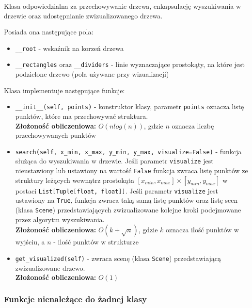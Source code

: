 \documentclass{article}
\begin{document}
Klasa odpowiedzialna za przechowywanie drzewa, enkapsulację wyszukiwania w drzewie oraz udostępnianie zwizualizowanego drzewa. 

Posiada ona następujące pola:
\begin{itemize}
    \item \texttt{\_\_root} - wskaźnik na korzeń drzewa
    \item \texttt{\_\_rectangles} oraz \texttt{\_\_dividers} - linie wyznaczające prostokąty, na które jest podzielone drzewo (pola używane przy wizualizacji)
\end{itemize}

Klasa implementuje następujące funkcje:
\begin{itemize}
    \item \texttt{\_\_init\_\_(self, points)} - konstruktor klasy, parametr \texttt{points} oznacza listę punktów, które ma przechowywać struktura.\\
    \textbf{Złożoność obliczeniowa:} $O(nlog(n))$, gdzie $n$ oznacza liczbę przechowywanych punktów

    \item \texttt{search(self, x\_min, x\_max, y\_min, y\_max, visualize=False)} - funkcja służąca do wyszukiwania w drzewie. Jeśli parametr \texttt{visualize} jest nieustawiony lub ustawiony na wartość \texttt{False} funkcja zwraca listę punktów ze struktury leżących wewnątrz prostokąta $[x_{min}, x_{max}] \times [y_{min}, y_{max}]$ w postaci \texttt{List[Tuple[float, float]]}. Jeśli parametr \texttt{visualize} jest ustawiony na \texttt{True}, funkcja zwraca taką samą listę punktów oraz listę scen (klasa \texttt{Scene}) przedstawiających zwizualizowane kolejne kroki podejmowane przez algorytm wyszukiwania. \\
    \textbf{Złożoność obliczeniowa: } $O(k + \sqrt{n})$, gdzie $k$ oznacza ilość punktów w wyjściu, a $n$ - ilość punktów w strukturze
    
    \item \texttt{get\_visualized(self)} - zwraca scenę (klasa \texttt{Scene}) przedstawiającą zwizualizowane drzewo.\\
    \textbf{Złożoność obliczeniowa:} $O(1)$
\end{itemize}

\subsubsection{Funkcje nienależące do żadnej klasy}
\end{document}
